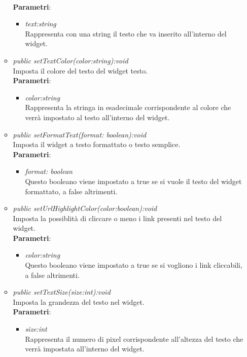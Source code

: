 \begin{itemize}
\begin{itemize}
		\\ \textbf{Parametri}: \begin{itemize}
		\item \textit{text:string}\\
		Rappresenta con una string il testo che va inserito all'interno del widget.
		\end{itemize} 
	\item \textit{public setTextColor(color:string):void}\\
	Imposta il colore del testo del widget testo.
		\\ \textbf{Parametri}: \begin{itemize}
		\item \textit{color:string}\\
		Rappresenta la stringa in esadecimale corrispondente al colore che verrà impostato al testo all'interno del widget.
		\end{itemize} 
	\item \textit{public setFormatText(format: boolean):void}\\
	Imposta il widget a testo formattato o testo semplice.
		\\ \textbf{Parametri}: \begin{itemize}
		\item \textit{format: boolean}\\
		Questo booleano viene impostato a true se si vuole il testo del widget formattato, a false altrimenti.
		\end{itemize} 
	\item \textit{public setUrlHighlightColor(color:boolean):void}\\
	Imposta la possiblità di cliccare o meno i link presenti nel testo del widget.
		\\ \textbf{Parametri}: \begin{itemize}
		\item \textit{color:string}\\
		Questo booleano viene impostato a true se si vogliono i link cliccabili, a false altrimenti.
		\end{itemize} 
	\item \textit{public setTextSize(size:int):void}\\
	Imposta la grandezza del testo nel widget.
		\\ \textbf{Parametri}: \begin{itemize}
		\item \textit{size:int}\\
		Rappresenta il numero di pixel corrispondente all'altezza del testo che verrà impostata all'interno del widget.

\end{itemize}
\end{itemize}
\end{itemize}
